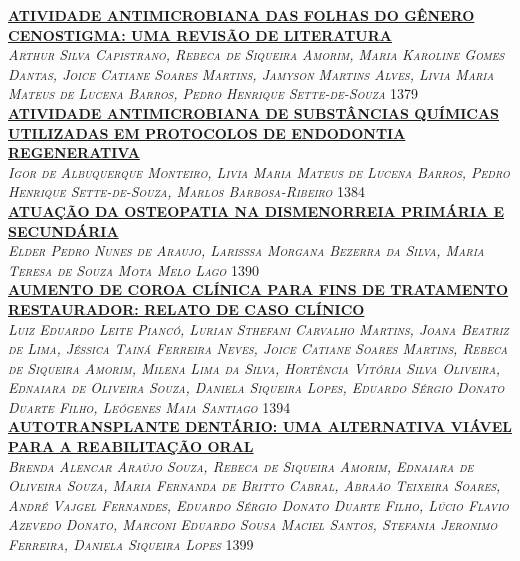 \noindent \textsc{\hyperlink{trabalhos/250497.pdf.1}{\textbf{ATIVIDADE ANTIMICROBIANA DAS FOLHAS DO GÊNERO CENOSTIGMA: UMA REVISÃO DE LITERATURA}}}\\ 
\noindent \textsc{\textit{Arthur Silva Capistrano, Rebeca de Siqueira Amorim, Maria Karoline Gomes Dantas, Joice Catiane Soares Martins, Jamyson Martins Alves, Livia Maria Mateus de Lucena Barros, Pedro Henrique Sette-de-Souza}} \hfill 1379\\ 

\noindent \textsc{\hyperlink{trabalhos/251860.pdf.1}{\textbf{ATIVIDADE ANTIMICROBIANA DE SUBSTÂNCIAS QUÍMICAS UTILIZADAS EM PROTOCOLOS DE ENDODONTIA REGENERATIVA}}}\\ 
\noindent \textsc{\textit{Igor de Albuquerque Monteiro, Livia Maria Mateus de Lucena Barros, Pedro Henrique Sette-de-Souza, Marlos Barbosa-Ribeiro}} \hfill 1384\\ 

\noindent \textsc{\hyperlink{trabalhos/250369.pdf.1}{\textbf{ATUAÇÃO DA OSTEOPATIA NA DISMENORREIA PRIMÁRIA E SECUNDÁRIA }}}\\ 
\noindent \textsc{\textit{Elder Pedro Nunes de Araujo, Larisssa Morgana Bezerra da Silva, Maria Teresa de Souza Mota Melo Lago}} \hfill 1390\\ 

\noindent \textsc{\hyperlink{trabalhos/251490.pdf.1}{\textbf{AUMENTO DE COROA CLÍNICA PARA FINS DE TRATAMENTO RESTAURADOR: RELATO DE CASO CLÍNICO}}}\\ 
\noindent \textsc{\textit{Luiz Eduardo Leite Piancó, Lurian Sthefani Carvalho Martins, Joana Beatriz de Lima, Jéssica Tainá Ferreira Neves, Joice Catiane Soares Martins, Rebeca de Siqueira Amorim, Milena Lima da Silva, Hortência Vitória Silva Oliveira, Ednaiara de Oliveira Souza, Daniela Siqueira Lopes, Eduardo Sérgio Donato Duarte Filho, Leógenes Maia Santiago}} \hfill 1394\\ 

\noindent \textsc{\hyperlink{trabalhos/250319.pdf.1}{\textbf{AUTOTRANSPLANTE DENTÁRIO: UMA ALTERNATIVA VIÁVEL PARA A REABILITAÇÃO ORAL}}}\\ 
\noindent \textsc{\textit{Brenda Alencar Araújo Souza, Rebeca de Siqueira Amorim, Ednaiara de Oliveira Souza, Maria Fernanda de Britto Cabral, Abraão Teixeira Soares, André Vajgel Fernandes, Eduardo Sérgio Donato Duarte Filho, Lúcio Flavio Azevedo Donato, Marconi Eduardo Sousa Maciel Santos, Stefania Jeronimo Ferreira, Daniela Siqueira Lopes}} \hfill 1399\\ 

